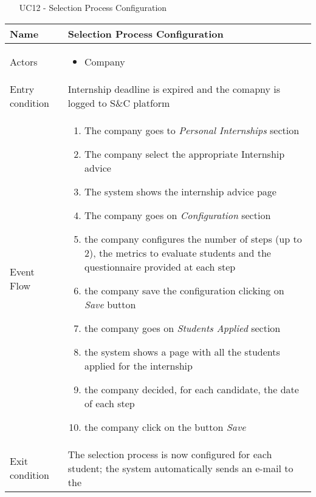 				
				\begin{table} [H]
					\centering
					\begin{itemize}
						\item [UC12] - Selection Process Configuration
					\end{itemize}
					\begin{tabular}{|| P{7.5cm} | P{7.5cm} ||}
						\hline
						Name & Selection Process Configuration \\
						\hline
						Actors & \parbox{5cm}{\begin{itemize}
								\item Company
							\end{itemize}
						} \\
						\hline
						Entry condition & Internship deadline is expired and the 
						comapny is logged to S\&C platform  \\
						\hline
						Event Flow & \parbox{5cm}{\begin{enumerate}[label=\alpha]
								\item The company goes to \textit{Personal 
								Internships} section
								\item The company select the 
								appropriate Internship advice  
								\item The system shows the internship 
								advice page
								\item  The company goes on 
								\textit{Configuration} section
								\item  the company configures the 
								number of steps (up to 2), the 
								metrics to evaluate students and 
								the questionnaire provided at 
								each step 
								\item the company save the 
								configuration clicking on \textit{Save}
								button 
								\item the company goes on \textit{Students 
								Applied} section
								\item the system shows a page with all 
								the students applied for the 
								internship 
								\item the company decided, for each 
								candidate, the date of each step
								\item the company click on the button 
								\textit{Save}
						\end{enumerate}} \\
						\hline 
						Exit condition & The selection process is now configured 
						for each student; the system 
						automatically sends an e-mail to the 

\end{tabular}
\end{table}
